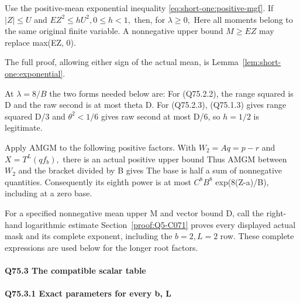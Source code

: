 Use the positive-mean exponential inequality \eqref{eq:short-one:positive-mgf}. If \(|Z|\le U\) and \(EZ^2\le hU^2,\allowbreak  0\le h<1,\allowbreak \) then, for \(\lambda\ge 0,\allowbreak \)
Here all moments belong to the same original finite variable.
A nonnegative upper bound \(M\ge EZ\) may replace max(EZ, 0).

The full proof, allowing either sign of the actual mean, is Lemma~\ref{lem:short-one:exponential}.

At \(\lambda=8/B\) the two forms needed below are:
For (Q75.2.2), the range squared is D and the raw second is at most theta D.
For (Q75.2.3), (Q75.1.3) gives range squared D/3 and \(\theta^2<1/6\) gives raw
second at most D/6, so \(h=1/2\) is legitimate.

Apply AMGM to the following positive factors. With \(W_2=Aq=p-r\) and \(X=T^L(qf_b),\allowbreak \) there is
an actual positive upper bound
Thus AMGM between \(W_2\) and the bracket divided by B gives
The base is half a sum of nonnegative quantities. Consequently its eighth
power is at most \(C^8B^8\) exp(8(Z-a)/B), including at a zero base.

For a specified nonnegative mean upper M and vector bound D, call the
right-hand logarithmic estimate
Section~\ref{proof:Q5-C071} proves every displayed actual mask and
its complete exponent, including the \(b=2,L=2\) row. These complete
expressions are used below for the longer root factors.

\paragraph{Q75.3 The compatible scalar table}\label{part:Q75.3}

\paragraph{Q75.3.1 Exact parameters for every b, L}

